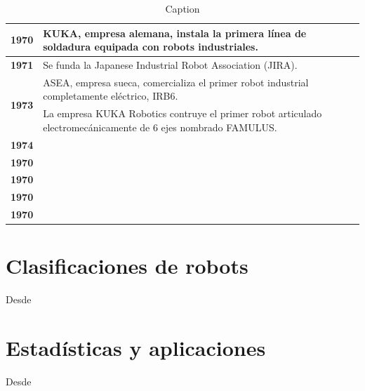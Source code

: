 \begin{table}[H]
\begin{tabular}{|c|m{12cm}|}
         \textbf{1970} & KUKA, empresa alemana, instala la primera línea de soldadura equipada con robots industriales. \\ \hline
         \textbf{1971} & Se funda la Japanese Industrial Robot Association (JIRA). \\ \hline
         \multirow{2}{*}{\textbf{1973}} & ASEA, empresa sueca, comercializa el primer robot industrial completamente eléctrico, IRB6. \\ \hline
          & La empresa KUKA Robotics contruye el primer robot articulado electromecánicamente de 6 ejes nombrado FAMULUS.\\ \hline
         \textbf{1974} &  \\ \hline
         \textbf{1970} &  \\ \hline
         \textbf{1970} &  \\ \hline
         \textbf{1970} &  \\ \hline
         \textbf{1970} &  \\ \hline
    \end{tabular}
    \caption{Caption}
    \label{tab:my_label}
\end{table}


    
\section{Clasificaciones de robots}
    Desde

    
    
    
\section{Estadísticas y aplicaciones}
    Desde
    
